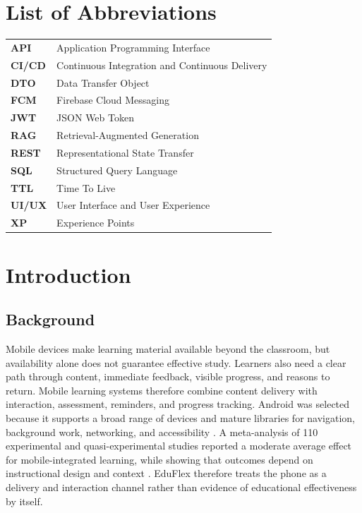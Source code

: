 \documentclass[12pt,a4paper,oneside]{report}
\begin{document}
\tableofcontents
\listoffigures
\listoftables

\chapter*{List of Abbreviations}
\begin{longtable}{>{\bfseries}P{0.18\textwidth}P{0.72\textwidth}}
API & Application Programming Interface \\
CI/CD & Continuous Integration and Continuous Delivery \\
DTO & Data Transfer Object \\
FCM & Firebase Cloud Messaging \\
JWT & JSON Web Token \\
RAG & Retrieval-Augmented Generation \\
REST & Representational State Transfer \\
SQL & Structured Query Language \\
TTL & Time To Live \\
UI/UX & User Interface and User Experience \\
XP & Experience Points \\
\end{longtable}

\clearpage
\hypersetup{pageanchor=false}
\hypersetup{pageanchor=true}

\chapter{Introduction}
\section{Background}
Mobile devices make learning material available beyond the classroom, but
availability alone does not guarantee effective study. Learners also need a clear
path through content, immediate feedback, visible progress, and reasons to return.
Mobile learning systems therefore combine content delivery with interaction,
assessment, reminders, and progress tracking. Android was selected because it
supports a broad range of devices and mature libraries for navigation, background
work, networking, and accessibility \cite{androidguide}. A meta-analysis of 110
experimental and quasi-experimental studies reported a moderate average effect for
mobile-integrated learning, while showing that outcomes depend on instructional design
and context \cite{sung2016}. EduFlex therefore treats the phone as a delivery and
interaction channel rather than evidence of educational effectiveness by itself.
\end{document}
